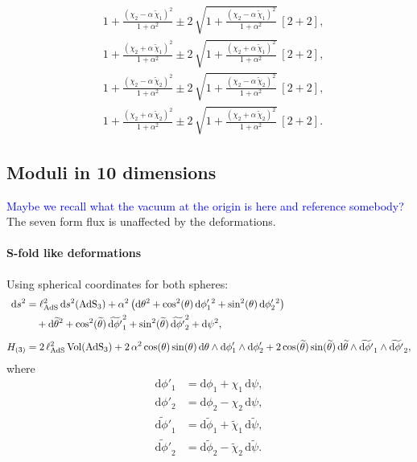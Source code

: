 \documentclass[a4paper, 11pt]{article}
\numberwithin{equation}{section}
\newcommand{\+}{\oplus}
\renewcommand{\d}{\ensuremath{\mathrm{d}}\xspace}
\newcommand{\MG}[1]{\textcolor{blue}{#1}}
\begin{document}
\begin{equation}
\begin{aligned}
		&1+\frac{\left(\chi_{2}-\alpha\,\widetilde{\chi}_{1}\right)^{2}}{1+\alpha^{2}} \pm 2\,\sqrt{1+\frac{\left(\chi_{2}-\alpha\,\widetilde{\chi}_{1}\right)^{2}}{1+\alpha^{2}}}\ [2+2], \\
		&1+\frac{\left(\chi_{2}+\alpha\,\widetilde{\chi}_{1}\right)^{2}}{1+\alpha^{2}} \pm 2\,\sqrt{1+\frac{\left(\chi_{2}+\alpha\,\widetilde{\chi}_{1}\right)^{2}}{1+\alpha^{2}}}\ [2+2], \\
		&1+\frac{\left(\chi_{2}-\alpha\,\widetilde{\chi}_{2}\right)^{2}}{1+\alpha^{2}} \pm 2\,\sqrt{1+\frac{\left(\chi_{2}-\alpha\,\widetilde{\chi}_{2}\right)^{2}}{1+\alpha^{2}}}\ [2+2], \\
		&1+\frac{\left(\chi_{2}+\alpha\,\widetilde{\chi}_{2}\right)^{2}}{1+\alpha^{2}} \pm 2\,\sqrt{1+\frac{\left(\chi_{2}+\alpha\,\widetilde{\chi}_{2}\right)^{2}}{1+\alpha^{2}}}\ [2+2].
	\end{aligned}
\end{equation}


\subsection{Moduli in 10 dimensions}
\MG{Maybe we recall what the vacuum at the origin is here and reference somebody?}
The seven form flux is unaffected by the deformations.

\paragraph{S-fold like deformations}
Using spherical coordinates for both spheres:
\begin{equation}
	\begin{aligned}
		\d s^{2} &= \ell_{\rm AdS}^{2} \,\d s^{2}({\rm AdS}_{3}) +\alpha^{2}\left(\d\theta^{2} + \cos^{2}(\theta)\,\d\phi'_{1}{}^{2} + \sin^{2}(\theta)\,\d\phi'_{2}{}^{2} \right) \\
		&\quad +\d\widetilde{\theta}^{2} + \cos^{2}(\widetilde{\theta})\,\widetilde{\d\phi'}_{1}^{2} + \sin^{2}(\widetilde{\theta})\,\widetilde{\d\phi'}_{2}^{2} + \d\psi^{2}, \\[5pt]
		H_{(3)} &= 2\,\ell_{\rm AdS}^{2}\,{\rm Vol}({\rm AdS_{3}}) + 2\,\alpha^{2}\cos(\theta)\sin(\theta)\,\d\theta\wedge\d\phi'_{1}\wedge\d\phi'_{2}+ 2\cos(\widetilde{\theta})\sin(\widetilde{\theta})\,\d\widetilde{\theta}\wedge\widetilde{\d\phi'}_{1}\wedge\widetilde{\d\phi'}_{2},
	\end{aligned}
\end{equation}
where
\begin{equation}
	\begin{aligned}
		\d\phi'_{1} &= \d\phi_{1} + \chi_{1}\,\d\psi,\\
		\d\phi'_{2} &= \d\phi_{2} - \chi_{2}\,\d\psi,\\
		\widetilde{\d\phi'}_{1} &= \d\widetilde{\phi}_{1} + \widetilde{\chi}_{1}\,\d\widetilde{\psi},\\
		\widetilde{\d\phi'}_{2} &= \d\widetilde{\phi}_{2} - \widetilde{\chi}_{2}\,\d\widetilde{\psi}.
	\end{aligned}
\end{equation}
\end{document}
